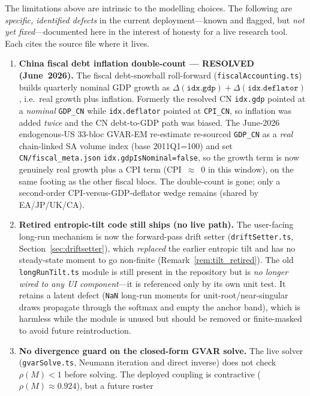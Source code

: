 \documentclass[11pt]{article}
\theoremstyle{definition}
\theoremstyle{remark}
\begin{document}
The limitations above are intrinsic to the modelling choices. The
following are \emph{specific, identified defects} in the current
deployment---known and flagged, but \emph{not yet fixed}---documented here
in the interest of honesty for a live research tool. Each cites the source
file where it lives.

\begin{enumerate}
  \item \textbf{China fiscal debt inflation double-count --- RESOLVED
    (June~2026).} The fiscal debt-snowball roll-forward
    (\texttt{fiscalAccounting.ts}) builds quarterly nominal GDP growth as
    $\Delta(\texttt{idx.gdp}) + \Delta(\texttt{idx.deflator})$, i.e.\ real
    growth plus inflation. Formerly the resolved CN \texttt{idx.gdp} pointed
    at a \emph{nominal} \texttt{GDP\_CN} while \texttt{idx.deflator} pointed
    at \texttt{CPI\_CN}, so inflation was added \emph{twice} and the CN
    debt-to-GDP path was biased. The June-2026 endogenous-US 33-bloc
    GVAR-EM re-estimate re-sourced \texttt{GDP\_CN} as a \emph{real}
    chain-linked SA volume index (base 2011Q1=100) and set
    \texttt{CN/fiscal\_meta.json} \texttt{idx.gdpIsNominal=false}, so the
    growth term is now genuinely real growth plus a CPI term (CPI~$\approx$~0
    in this window), on the same footing as the other fiscal blocs. The
    double-count is gone; only a second-order CPI-versus-GDP-deflator wedge
    remains (shared by EA/JP/UK/CA).
  \item \textbf{Retired entropic-tilt code still ships (no live path).}
    The user-facing long-run mechanism is now the forward-pass drift
    setter (\texttt{driftSetter.ts}, Section~\ref{sec:driftsetter}), which
    \emph{replaced} the earlier entropic tilt and has no steady-state
    moment to go non-finite (Remark~\ref{rem:tilt_retired}). The old
    \texttt{longRunTilt.ts} module is still present in the repository but
    is \emph{no longer wired to any UI component}---it is referenced only
    by its own unit test. It retains a latent defect (\texttt{NaN} long-run
    moments for unit-root/near-singular draws propagate through the softmax
    and empty the anchor band), which is harmless while the module is
    unused but should be removed or finite-masked to avoid future
    reintroduction.
  \item \textbf{No divergence guard on the closed-form GVAR solve.} The
    live solver (\texttt{gvarSolve.ts}, Neumann iteration and direct
    inverse) does not check $\rho(M)<1$ before solving. The deployed
    coupling is contractive ($\rho(M)\approx 0.924$), but a future roster

\end{enumerate}
\end{document}

